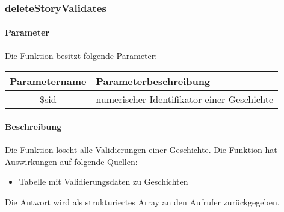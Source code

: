 \subsubsection{deleteStoryValidates}
\paragraph{Parameter} Die Funktion besitzt folgende Parameter:
\begin{table}[H]
	\begin{tabular}{|c|p{11cm}|}
		\hline
		\textbf{Parametername} & \textbf{Parameterbeschreibung} \\ \hline
		\$sid & numerischer Identifikator einer Geschichte \\ \hline
	\end{tabular}
\end{table}
\paragraph{Beschreibung} Die Funktion löscht alle Validierungen einer Geschichte. Die Funktion hat Auswirkungen auf folgende Quellen:
\begin{itemize}
	\item Tabelle mit Validierungsdaten zu Geschichten
\end{itemize}
Die Antwort wird als strukturiertes Array an den Aufrufer zurückgegeben.
